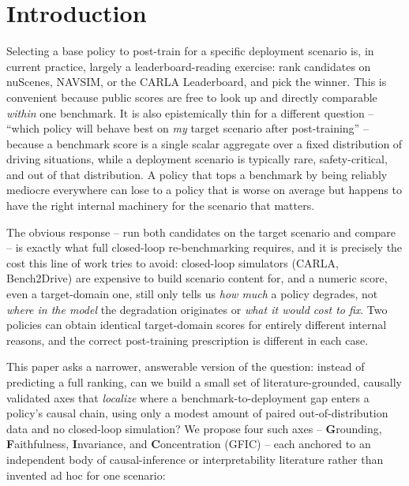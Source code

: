 \section{Introduction}
\label{sec:intro}

Selecting a base policy to post-train for a specific deployment scenario is, in current
practice, largely a leaderboard-reading exercise: rank candidates on nuScenes, NAVSIM, or
the CARLA Leaderboard, and pick the winner. This is convenient because public scores are
free to look up and directly comparable \emph{within} one benchmark. It is also
epistemically thin for a different question -- ``which policy will behave best on
\emph{my} target scenario after post-training'' -- because a benchmark score is a single
scalar aggregate over a fixed distribution of driving situations, while a deployment
scenario is typically rare, safety-critical, and out of that distribution. A policy that
tops a benchmark by being reliably mediocre everywhere can lose to a policy that is
worse on average but happens to have the right internal machinery for the scenario that
matters.

The obvious response -- run both candidates on the target scenario and compare -- is
exactly what full closed-loop re-benchmarking requires, and it is precisely the cost this
line of work tries to avoid: closed-loop simulators (CARLA, Bench2Drive) are expensive to
build scenario content for, and a numeric score, even a target-domain one, still only
tells us \emph{how much} a policy degrades, not \emph{where in the model} the
degradation originates or \emph{what it would cost to fix}. Two policies can obtain
identical target-domain scores for entirely different internal reasons, and the correct
post-training prescription is different in each case.

This paper asks a narrower, answerable version of the question: instead of predicting a
full ranking, can we build a small set of literature-grounded, causally validated axes
that \emph{localize} where a benchmark-to-deployment gap enters a policy's causal chain,
using only a modest amount of paired out-of-distribution data and no closed-loop
simulation? We propose four such axes -- \textbf{G}rounding, \textbf{F}aithfulness,
\textbf{I}nvariance, and \textbf{C}oncentration (GFIC) -- each anchored to an independent
body of causal-inference or interpretability literature rather than invented ad hoc for
one scenario:

